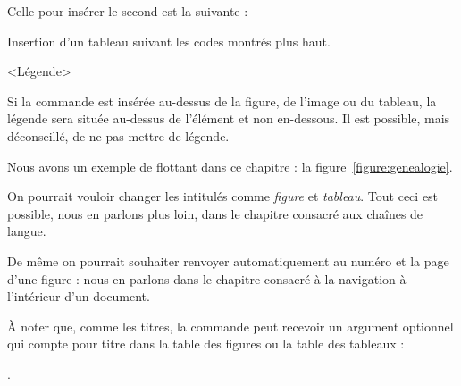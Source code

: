 Celle pour insérer le second est la suivante :

\begin{latexcode}
\begin{table}[<paramètre de placement>]
    Insertion d'un tableau suivant les codes montrés plus haut.
    \caption{<Légende>}
\end{table} 
\end{latexcode}

Si la commande  est insérée au-dessus de la figure, de l'image ou du tableau, la légende sera située au-dessus de l'élément et non en-dessous. Il est possible, mais déconseillé, de ne pas mettre de légende.

Nous avons un exemple de flottant   dans ce chapitre : la figure~\ref{figure:genealogie}.
\begin{attention}
    On pourrait vouloir changer les intitulés comme \emph{figure} et \emph{tableau}. Tout ceci est possible, nous en parlons plus loin, dans le chapitre consacré aux chaînes de langue.
    
    De même on pourrait souhaiter renvoyer automatiquement au numéro et la page d'une figure : nous en parlons dans le chapitre consacré à la navigation à l'intérieur d'un document.
\end{attention}

À noter que, comme les titres, la commande  peut recevoir un argument optionnel qui compte pour titre dans la table des figures ou la table des tableaux : 

. 



